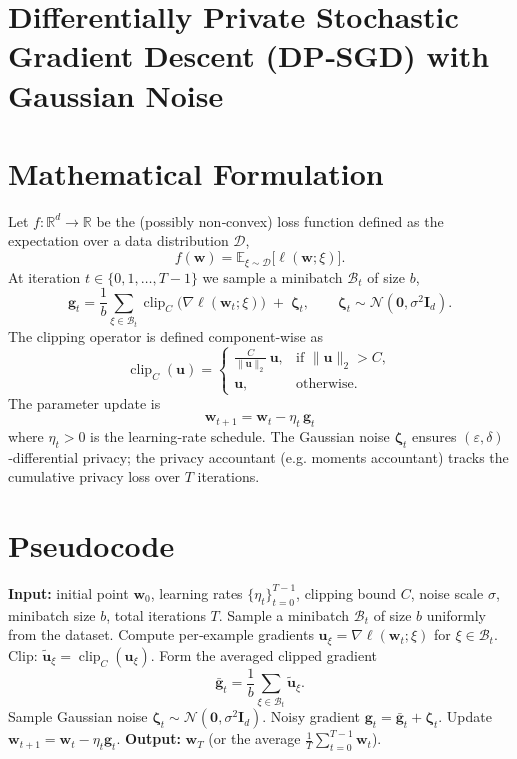 \documentclass{article}
\begin{document}
\section*{Differentially Private Stochastic Gradient Descent (DP‑SGD) with Gaussian Noise}

\section*{Mathematical Formulation}
Let $f:\mathbb{R}^d\rightarrow\mathbb{R}$ be the (possibly non‑convex) loss function defined as the expectation over a data distribution $\mathcal{D}$,
\[
f(\mathbf{w})=\mathbb{E}_{\xi\sim\mathcal{D}}\big[\ell(\mathbf{w};\xi)\big].
\]
At iteration $t\in\{0,1,\dots,T-1\}$ we sample a minibatch $\mathcal{B}_t$ of size $b$,
\[
\mathbf{g}_t = \frac{1}{b}\sum_{\xi\in\mathcal{B}_t}\operatorname{clip}_C\big(\nabla\ell(\mathbf{w}_t;\xi)\big) \;+\; \bm{\zeta}_t,
\qquad
\bm{\zeta}_t\sim\mathcal{N}(\mathbf{0},\sigma^2\mathbf{I}_d).
\]
The clipping operator is defined component‑wise as
\[
\operatorname{clip}_C(\mathbf{u})=
\begin{cases}
\displaystyle \frac{C}{\|\mathbf{u}\|_2}\,\mathbf{u}, & \text{if }\|\mathbf{u}\|_2>C,\\[4pt]
\mathbf{u}, & \text{otherwise.}
\end{cases}
\]
The parameter update is
\[
\boxed{\;\mathbf{w}_{t+1}= \mathbf{w}_t-\eta_t\,\mathbf{g}_t\;}
\tag{1}
\]
where $\eta_t>0$ is the learning‑rate schedule. The Gaussian noise $\bm{\zeta}_t$ ensures $(\varepsilon,\delta)$‑differential privacy; the privacy accountant (e.g. moments accountant) tracks the cumulative privacy loss over $T$ iterations.

\section*{Pseudocode}
\begin{algorithm}[H]
\caption{DP‑SGD with Gaussian Noise}
\begin{algorithmic}[1]
\STATE \textbf{Input:} initial point $\mathbf{w}_0$, learning rates $\{\eta_t\}_{t=0}^{T-1}$, clipping bound $C$, noise scale $\sigma$, minibatch size $b$, total iterations $T$.
    \STATE Sample a minibatch $\mathcal{B}_t$ of size $b$ uniformly from the dataset.
    \STATE Compute per‑example gradients $\mathbf{u}_\xi=\nabla\ell(\mathbf{w}_t;\xi)$ for $\xi\in\mathcal{B}_t$.
    \STATE Clip: $\tilde{\mathbf{u}}_\xi=\operatorname{clip}_C(\mathbf{u}_\xi)$.
    \STATE Form the averaged clipped gradient 
    \[
    \bar{\mathbf{g}}_t=\frac{1}{b}\sum_{\xi\in\mathcal{B}_t}\tilde{\mathbf{u}}_\xi .
    \]
    \STATE Sample Gaussian noise $\bm{\zeta}_t\sim\mathcal{N}(\mathbf{0},\sigma^2\mathbf{I}_d)$.
    \STATE Noisy gradient $\mathbf{g}_t=\bar{\mathbf{g}}_t+\bm{\zeta}_t$.
    \STATE Update $\mathbf{w}_{t+1}= \mathbf{w}_t-\eta_t\mathbf{g}_t$.
\ENDFOR
\STATE \textbf{Output:} $\mathbf{w}_T$ (or the average $\frac{1}{T}\sum_{t=0}^{T-1}\mathbf{w}_t$).
\end{algorithmic}
\end{algorithm}
\end{document}
